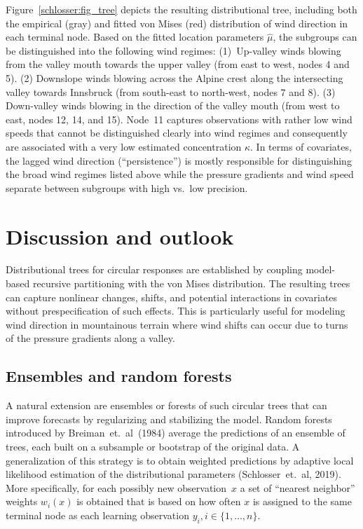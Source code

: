 \documentclass[twoside]{report}
\begin{document}
Figure~\ref{schlosser:fig_tree} depicts the resulting distributional tree, including
both the empirical (gray) and fitted von Mises (red) distribution of wind direction
in each terminal node. Based on the fitted location parameters $\hat \mu$, the subgroups
can be distinguished into the following wind regimes:
(1)~Up-valley winds blowing from the valley mouth towards the upper valley
(from east to west, nodes 4 and 5). (2) Downslope winds blowing across
the Alpine crest along the intersecting valley towards Innsbruck (from south-east to
north-west, nodes 7 and 8). (3) Down-valley winds blowing in the direction
of the valley mouth (from west to east, nodes 12, 14, and 15). Node~11
captures observations with rather low wind speeds that cannot be distinguished
clearly into wind regimes and consequently are associated with a very low
estimated concentration $\hat \kappa$. In terms of covariates, the lagged
wind direction (``persistence'') is mostly responsible for distinguishing
the broad wind regimes listed above while the pressure gradients and wind
speed separate between subgroups with high vs.\ low precision.

\section{Discussion and outlook}

Distributional trees for circular responses are established by coupling
model-based recursive partitioning with the von Mises distribution.
The resulting trees can capture nonlinear changes, shifts, and potential interactions
in covariates without prespecification of such effects. This is particularly
useful for modeling wind direction in mountainous terrain where wind shifts
can occur due to turns of the pressure gradients along a valley.

\subsection{Ensembles and random forests}
A natural extension are ensembles or forests of such circular trees
that can improve forecasts by regularizing and stabilizing the model.
Random forests introduced by Breiman~et.~al~(1984) average the
predictions of an ensemble of trees, each built on a subsample 
or bootstrap of the original data. 
A generalization of this strategy is to obtain weighted predictions
by adaptive local likelihood estimation of the distributional parameters
(Schlosser~et.~al, 2019). More specifically, for each possibly new
observation~$x$ a set of ``nearest neighbor'' weights $w_i(x)$ is obtained 
that is based on how often $x$ is assigned to the same terminal node as
each learning observation $y_i, i \in \{1,\ldots,n\}$.
\end{document}
